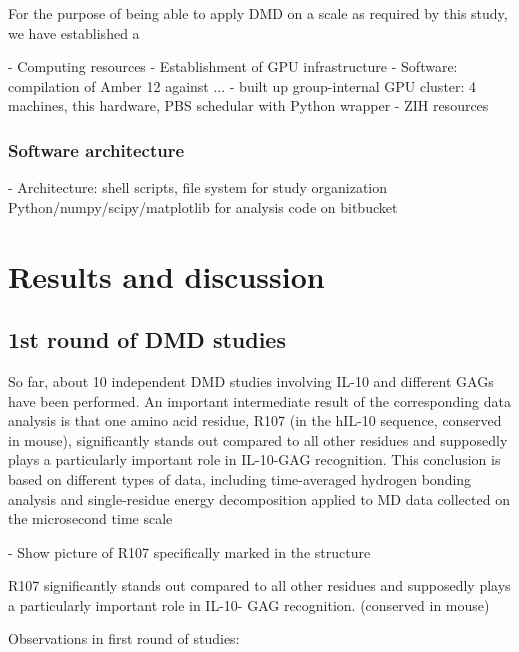 For the purpose of being able to apply DMD on a scale as required by this study,
we have established a

        - Computing resources
            - Establishment of GPU infrastructure
                - Software: compilation of Amber 12 against ...
                - built up group-internal GPU cluster:
                    4 machines, this hardware, PBS schedular with Python wrapper
                - ZIH resources

\subsubsection{Software architecture}

        - Architecture:
            shell scripts, file system for study organization
            Python/numpy/scipy/matplotlib for analysis
            code on bitbucket



\section{Results and discussion}

\subsection{1st round of DMD studies}



So far, about 10 independent DMD studies involving IL-10 and different GAGs have
been performed. An important intermediate result of the corresponding data analysis
is that one amino acid residue, R107 (in the hIL-10 sequence, conserved in mouse), significantly
stands out compared to all other residues and supposedly plays a particularly
important role in IL-10-GAG recognition. This conclusion is based on different types
of data, including time-averaged hydrogen bonding analysis and single-residue energy
decomposition applied to MD data collected on the microsecond time scale

- Show picture of R107 specifically marked in the structure


R107 significantly stands out compared to all other residues
and supposedly plays a particularly important role in IL-10-
GAG recognition.
(conserved in mouse)

Observations in first round of studies:

